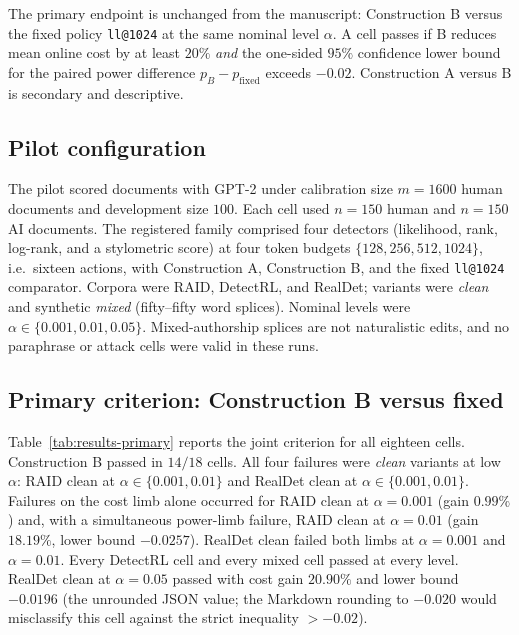 \documentclass[pdflatex,sn-mathphys-num]{sn-jnl}
\begin{document}
The primary endpoint is unchanged from the manuscript: Construction B versus the fixed policy \texttt{ll@1024} at the same nominal level \(\alpha\). A cell passes if B reduces mean online cost by at least \(20\%\) \emph{and} the one-sided \(95\%\) confidence lower bound for the paired power difference \(p_B-p_{\mathrm{fixed}}\) exceeds \(-0.02\). Construction A versus B is secondary and descriptive.

\subsection{Pilot configuration}

The pilot scored documents with GPT-2 under calibration size \(m=1600\) human documents and development size \(100\). Each cell used \(n=150\) human and \(n=150\) AI documents. The registered family comprised four detectors (likelihood, rank, log-rank, and a stylometric score) at four token budgets \(\{128,256,512,1024\}\), i.e.\ sixteen actions, with Construction A, Construction B, and the fixed \texttt{ll@1024} comparator. Corpora were RAID, DetectRL, and RealDet; variants were \emph{clean} and synthetic \emph{mixed} (fifty--fifty word splices). Nominal levels were \(\alpha\in\{0.001,0.01,0.05\}\). Mixed-authorship splices are not naturalistic edits, and no paraphrase or attack cells were valid in these runs.

\subsection{Primary criterion: Construction B versus fixed}

Table~\ref{tab:results-primary} reports the joint criterion for all eighteen cells. Construction B passed in \(14/18\) cells. All four failures were \emph{clean} variants at low \(\alpha\): RAID clean at \(\alpha\in\{0.001,0.01\}\) and RealDet clean at \(\alpha\in\{0.001,0.01\}\). Failures on the cost limb alone occurred for RAID clean at \(\alpha=0.001\) (gain \(0.99\%\)) and, with a simultaneous power-limb failure, RAID clean at \(\alpha=0.01\) (gain \(18.19\%\), lower bound \(-0.0257\)). RealDet clean failed both limbs at \(\alpha=0.001\) and \(\alpha=0.01\). Every DetectRL cell and every mixed cell passed at every level. RealDet clean at \(\alpha=0.05\) passed with cost gain \(20.90\%\) and lower bound \(-0.0196\) (the unrounded JSON value; the Markdown rounding to \(-0.020\) would misclassify this cell against the strict inequality \(>-0.02\)).
\end{document}
